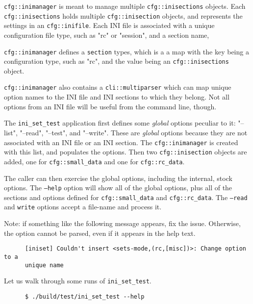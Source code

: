    \texttt{cfg::inimanager} is meant to manage multiple
   \texttt{cfg::inisections} objects.
   Each \texttt{cfg::inisections} holds multiple
   \texttt{cfg::inisection} objects, and represents the
   settings in an \texttt{cfg::inifile}.
   Each INI file is associated with a unique configuration file type,
   such as "rc" or "session", and a section name,

   \texttt{cfg::inimanager} defines a \texttt{section} types, which is a 
   a map with the key being a configuration type, such as "rc", and
   the value being an \texttt{cfg::inisections} object.

   \texttt{cfg::inimanager} also contains a
   \texttt{cli::multiparser} which can map unique option names to
   the INI file and INI sections to which they belong.
   Not all options from an INI file will be useful from the command
   line, though.

   The \texttt{ini\_set\_test} application first defines some
   \textsl{global} options
   peculiar to it: "--list", "--read", "--test", and "--write".
   These are \textsl{global} options because they are not associated with
   an INI file or an INI section.
   The \texttt{cfg::inimanager} is created with this list, and populates
   the options. Then two \texttt{cfg::inisection} objects are
   added, one for \texttt{cfg::small\_data} and
   one for \texttt{cfg::rc\_data}.

   The caller can then exercise the global options, including the internal,
   stock options.  The \texttt{--help} option will show all of the global
   options, plus all of the sections and options defined for
   \texttt{cfg::small\_data} and
   \texttt{cfg::rc\_data}.
   The \texttt{--read} and \texttt{write} options accept a file-name and
   process it.

   Note: if something like the following message appears, fix the issue.
   Otherwise, the option cannot be parsed, even if it appears in the
   help text.

   \begin{verbatim}
      [iniset] Couldn't insert <sets-mode,(rc,[misc])>: Change option to a
      unique name
   \end{verbatim}

   Let us walk through some runs of
   \texttt{ini\_set\_test}.

   \begin{verbatim}
      $ ./build/test/ini_set_test --help
   \end{verbatim}


